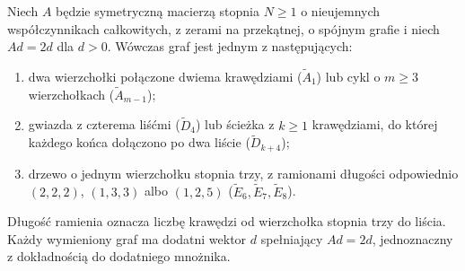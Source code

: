 \begin{twierdzenie}
\label{aa:tw:mckay-graphs}
Niech $A$ będzie symetryczną macierzą stopnia $N\ge1$
o nieujemnych współczynnikach całkowitych, z zerami na przekątnej,
o spójnym grafie i niech $Ad=2d$ dla $d>0$.
Wówczas graf jest jednym z następujących:
\begin{enumerate}
\item dwa wierzchołki połączone dwiema krawędziami
      ($\widetilde A_1$) lub cykl o $m\ge3$ wierzchołkach
      ($\widetilde A_{m-1}$);
\item gwiazda z czterema liśćmi ($\widetilde D_4$)
      lub ścieżka z $k\ge1$ krawędziami, do której
      każdego końca dołączono po dwa liście
      ($\widetilde D_{k+4}$);
\item drzewo o jednym wierzchołku stopnia trzy,
      z ramionami długości odpowiednio $(2,2,2)$,
      $(1,3,3)$ albo $(1,2,5)$
      ($\widetilde E_6,\widetilde E_7,\widetilde E_8$).
\end{enumerate}
Długość ramienia oznacza liczbę krawędzi od wierzchołka
stopnia trzy do liścia. Każdy wymieniony graf ma
dodatni wektor $d$ spełniający $Ad=2d$, jednoznaczny
z dokładnością do dodatniego mnożnika.
\end{twierdzenie}
